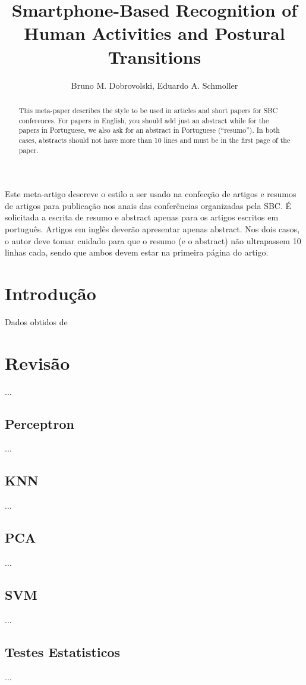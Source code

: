 \documentclass[12pt]{article}
\title{Smartphone-Based Recognition of Human Activities and Postural Transitions}
\author{Bruno M. Dobrovolski\inst{1}, Eduardo A. Schmoller\inst{1}}
\begin{document}
 

\maketitle

\begin{abstract}
  This meta-paper describes the style to be used in articles and short papers
  for SBC conferences. For papers in English, you should add just an abstract
  while for the papers in Portuguese, we also ask for an abstract in
  Portuguese (``resumo''). In both cases, abstracts should not have more than
  10 lines and must be in the first page of the paper.
\end{abstract}
     
\begin{resumo} 
  Este meta-artigo descreve o estilo a ser usado na confecção de artigos e
  resumos de artigos para publicação nos anais das conferências organizadas
  pela SBC. É solicitada a escrita de resumo e abstract apenas para os artigos
  escritos em português. Artigos em inglês deverão apresentar apenas abstract.
  Nos dois casos, o autor deve tomar cuidado para que o resumo (e o abstract)
  não ultrapassem 10 linhas cada, sendo que ambos devem estar na primeira
  página do artigo.
\end{resumo}

\section{Introdução}
	Dados obtidos de \cite{Dua:2017}
\section{Revisão}
	...
\subsection{Perceptron}
	...
\subsection{KNN}
	...
\subsection{PCA}
	...
\subsection{SVM}
	...
\subsection{Testes Estatisticos}
	...
\end{document}
